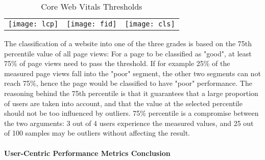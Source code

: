 \begin{table}[h]
	\centering
	\begin{tabular}{ c c c }
	\texttt{[image: lcp]} &
	\texttt{[image: fid]} &
	\texttt{[image: cls]} \\
	\end{tabular}
	\medskip
	\caption{Core Web Vitals Thresholds}
	\label{table:vitals_thresholds}
\end{table}






The classification of a website into one of the three grades is based on the 75th percentile value of all page views:
For a page to be classified as "good", at least 75\% of page views need to pass the threshold.
If for example 25\% of the measured page views fall into the "poor" segment,  the other two segments can not reach 75\%, hence the page would be classified to have "poor" performance.
The reasoning behind the 75th percentile is that it guarantees that a large proportion of users are taken into account, and that the value at the selected percentile should not be too influenced by outliers.
75\% percentile is a compromise between the two arguments: 3 out of 4 users experience the measured values, and 25 out of 100 samples may be outliers without affecting the result.






\paragraph{User-Centric Performance Metrics Conclusion} %


